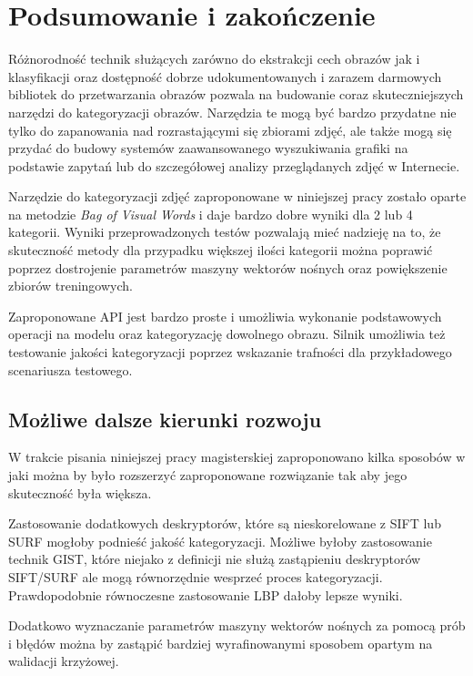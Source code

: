 \chapter{Podsumowanie i zakończenie}

Różnorodność technik służących zarówno do ekstrakcji cech obrazów jak i klasyfikacji oraz dostępność dobrze udokumentowanych i zarazem darmowych bibliotek do przetwarzania obrazów pozwala na budowanie coraz skuteczniejszych narzędzi do kategoryzacji obrazów. Narzędzia te mogą być bardzo przydatne nie tylko do zapanowania nad rozrastającymi się zbiorami zdjęć, ale także mogą się przydać do budowy systemów zaawansowanego wyszukiwania grafiki na podstawie zapytań lub do szczegółowej analizy przeglądanych zdjęć w Internecie.

Narzędzie do kategoryzacji zdjęć zaproponowane w niniejszej pracy zostało oparte na metodzie \emph{Bag of Visual Words} i daje bardzo dobre wyniki dla 2 lub 4 kategorii. Wyniki przeprowadzonych testów pozwalają mieć nadzieję na to, że skuteczność metody dla przypadku większej ilości kategorii można poprawić poprzez dostrojenie parametrów maszyny wektorów nośnych oraz powiększenie zbiorów treningowych.

Zaproponowane API jest bardzo proste i umożliwia wykonanie podstawowych operacji na modelu oraz kategoryzację dowolnego obrazu. Silnik umożliwia też testowanie jakości kategoryzacji poprzez wskazanie trafności dla przykładowego scenariusza testowego. 

\section{Możliwe dalsze kierunki rozwoju}

W trakcie pisania niniejszej pracy magisterskiej zaproponowano kilka sposobów w jaki można by było rozszerzyć zaproponowane rozwiązanie tak aby jego skuteczność była większa.

Zastosowanie dodatkowych deskryptorów, które są nieskorelowane z SIFT lub SURF mogłoby podnieść jakość kategoryzacji. Możliwe byłoby zastosowanie technik GIST, które niejako z definicji nie służą zastąpieniu deskryptorów SIFT/SURF ale mogą równorzędnie wesprzeć proces kategoryzacji. Prawdopodobnie równoczesne zastosowanie LBP dałoby lepsze wyniki.  

Dodatkowo wyznaczanie parametrów maszyny wektorów nośnych za pomocą prób i błędów można by zastąpić bardziej wyrafinowanymi sposobem opartym na walidacji krzyżowej.